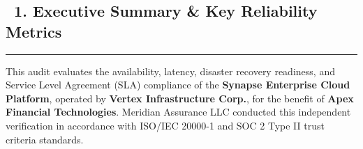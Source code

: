 \documentclass[11pt,a4paper]{scrartcl}
\begin{document}
\vspace{1pt}

\subsection*{\textcolor{navyblue}{\faChartLine\ 1. Executive Summary \& Key Reliability Metrics}}
\hrule
\vspace{2pt}

This audit evaluates the availability, latency, disaster recovery readiness, and Service Level Agreement (SLA) compliance of the \textbf{Synapse Enterprise Cloud Platform}, operated by \textbf{Vertex Infrastructure Corp.}, for the benefit of \textbf{Apex Financial Technologies}. Meridian Assurance LLC conducted this independent verification in accordance with ISO/IEC 20000-1 and SOC 2 Type II trust criteria standards.

\vspace{3pt}
\end{document}
